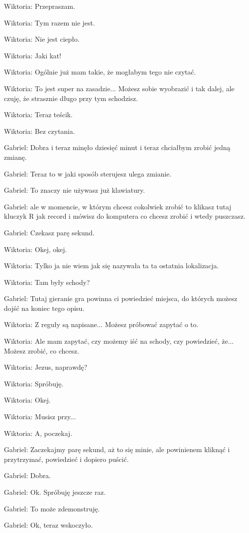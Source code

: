 Wiktoria: Przepraszam.

Wiktoria: Tym razem nie jest.

Wiktoria: Nie jest ciepło.

Wiktoria: Jaki kat!

Wiktoria: Ogólnie już mam takie, że mogłabym tego nie czytać.

Wiktoria: To jest super na zasadzie... Możesz sobie wyobrazić i tak dalej, ale czuję, że strasznie długo przy tym schodzisz.

Wiktoria: Teraz teścik.

Wiktoria: Bez czytania.

Gabriel: Dobra i teraz minęło dziesięć minut i teraz chciałbym zrobić jedną zmianę.

Gabriel: Teraz to w jaki sposób sterujesz ulega zmianie.

Gabriel: To znaczy nie używasz już klawiatury.

Gabriel: ale w momencie, w którym chcesz cokolwiek zrobić to klikasz tutaj kluczyk R jak record i mówisz do komputera co chcesz zrobić i wtedy puszczasz.

Gabriel: Czekasz parę sekund.

Wiktoria: Okej, okej.

Wiktoria: Tylko ja nie wiem jak się nazywała ta ta ostatnia lokalizacja.

Wiktoria: Tam były schody?

Gabriel: Tutaj gieranie gra powinna ci powiedzieć miejsca, do których możesz dojść na koniec tego opisu.

Wiktoria: Z reguły są napisane... Możesz próbować zapytać o to.

Wiktoria: Ale mam zapytać, czy możemy iść na schody, czy powiedzieć, że... Możesz zrobić, co chcesz.

Wiktoria: Jezus, naprawdę?

Wiktoria: Spróbuję.

Wiktoria: Okej.

Wiktoria: Musisz przy...

Wiktoria: A, poczekaj.

Gabriel: Zaczekajmy parę sekund, aż to się minie, ale powinienem kliknąć i przytrzymać, powiedzieć i dopiero puścić.

Gabriel: Dobra.

Gabriel: Ok. Spróbuję jeszcze raz.

Gabriel: To może zdemonstruję.

Gabriel: Ok, teraz wskoczyło.

